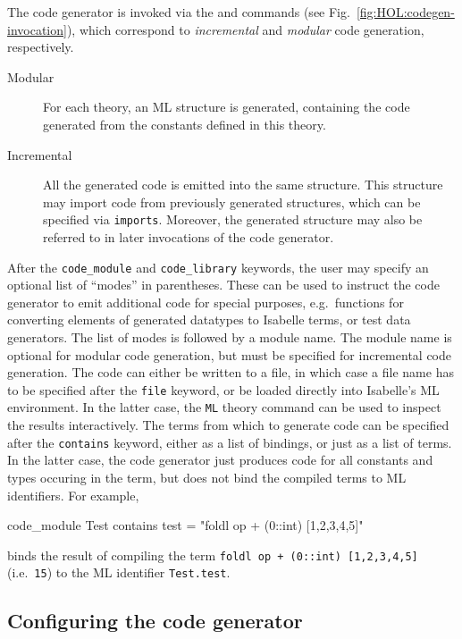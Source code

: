 The code generator is invoked via the  and
 commands (see Fig.~\ref{fig:HOL:codegen-invocation}),
which correspond to {\em incremental} and {\em modular} code generation,
respectively.
\begin{description}
\item[Modular] For each theory, an ML structure is generated, containing the
  code generated from the constants defined in this theory.
\item[Incremental] All the generated code is emitted into the same structure.
  This structure may import code from previously generated structures, which
  can be specified via \texttt{imports}.
  Moreover, the generated structure may also be referred to in later invocations
  of the code generator.
\end{description}
After the \texttt{code_module} and \texttt{code_library} keywords, the user
may specify an optional list of ``modes'' in parentheses. These can be used
to instruct the code generator to emit additional code for special purposes,
e.g.\ functions for converting elements of generated datatypes to Isabelle terms,
or test data generators. The list of modes is followed by a module name.
The module name is optional for modular code generation, but must be specified
for incremental code generation.
The code can either be written to a file,
in which case a file name has to be specified after the \texttt{file} keyword, or be
loaded directly into Isabelle's ML environment. In the latter case,
the \texttt{ML} theory command can be used to inspect the results
interactively.
The terms from which to generate code can be specified after the
\texttt{contains} keyword, either as a list of bindings, or just as
a list of terms. In the latter case, the code generator just produces
code for all constants and types occuring in the term, but does not
bind the compiled terms to ML identifiers.
For example,
\begin{ttbox}
code_module Test
contains
  test = "foldl op + (0::int) [1,2,3,4,5]"
\end{ttbox}
binds the result of compiling the term
\texttt{foldl op + (0::int) [1,2,3,4,5]}
(i.e.~\texttt{15}) to the ML identifier \texttt{Test.test}.

\subsection{Configuring the code generator}

